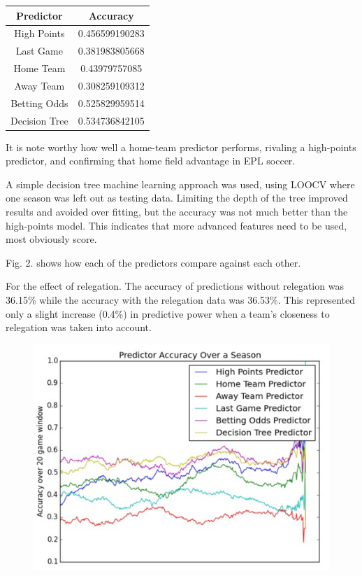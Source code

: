 \documentclass[conference]{IEEEtran}
\begin{document}
\begin{center}
  \begin{tabular}{@{} cc @{}}
    \hline
    Predictor & Accuracy \\ 
    \hline
High Points & 0.456599190283 \\ 
    Last Game & 0.381983805668\\ 
    Home Team & 0.43979757085 \\ 
    Away Team & 0.308259109312\\ 
    Betting Odds & 0.525829959514\\
    Decision Tree & 0.534736842105\\
    \hline
  \end{tabular}
\end{center}

It is note worthy how well a home-team predictor performs, rivaling a high-points predictor, and confirming that home field advantage in EPL soccer.

A simple decision tree machine learning approach was used, using LOOCV where one season was left out as testing data. Limiting the depth of the tree improved results and avoided over fitting, but the accuracy was not much better than the high-points model. This indicates that more advanced features need to be used, most obviously score.

Fig. 2. shows how each of the predictors compare against each other. 

For the effect of relegation. The accuracy of predictions without relegation was 36.15\% while the accuracy with the relegation data was 36.53\%. This represented only a slight increase (0.4\%) in predictive power when a team's closeness to relegation was taken into account.

\begin{figure}[t]
\centering
\includegraphics[width=0.7\linewidth]{graph}
\caption{}
\label{fig:graph}
\end{figure}
\end{document}
